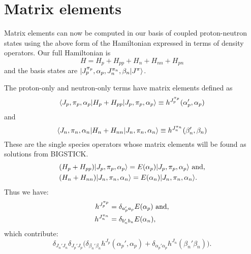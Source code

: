 \section{Matrix elements}
Matrix elements can now be computed in our basis of coupled proton-neutron states
using the above form of the Hamiltonian expressed in terms of density operators.
Our full Hamiltonian is 
\begin{equation}
 H = H_p + H_{pp} + H_n + H_{nn} + H_{pn}
\end{equation}
and the basis states are $|J_p^{\pi_p},\alpha_p,J_n^{\pi_n},\beta_n|J^{\pi}\rangle$. 

The proton-only and neutron-only terms have matrix elements defined as
\begin{equation}
    \langle J_p,\pi_p,\alpha_p| H_p+H_{pp} |J_p,\pi_p,\alpha_p\rangle \equiv 
        h^{J_p^{\pi_p}}(\alpha_p',\alpha_p)
\end{equation}
and
\begin{equation}
    \langle J_n,\pi_n,\alpha_n| H_n + H_{nn} |J_n,\pi_n,\alpha_n\rangle \equiv 
        h^{J_n^{\pi_n}}(\beta_n',\beta_n)
\end{equation}
These are the single species operators whose matrix elements will be found as
solutions from BIGSTICK.                                         
\begin{equation}\begin{split}
    &(H_p+H_{pp}) |J_p,\pi_p,\alpha_p\rangle = E(\alpha_p)|J_p,\pi_p,\alpha_p\rangle \textnormal{ and,} \\
    &(H_n+H_{nn}) |J_n,\pi_n,\alpha_n\rangle = E(\alpha_n)|J_n,\pi_n,\alpha_n\rangle.
\end{split}\end{equation}
Thus we have:
\begin{equation}\begin{split}
    h^{J_p^{\pi_p}} &= \delta_{a_p'a_p} E(\alpha_p) \textnormal{ and,} \\
    h^{J_n^{\pi_n}} &= \delta_{b_n'b_n}E(\alpha_n),
\end{split}\end{equation}
which contribute:
\begin{equation}
    \delta_{J_n'J_n}\delta_{J_p'J_p}\Big( \delta_{\beta_n'\beta_n}h^{J_p}
(\alpha_p',\alpha_p) + 
 \delta_{\alpha_p'\alpha_p}h^{J_n}(\beta_n'\beta_n)\Big). 
\end{equation}


